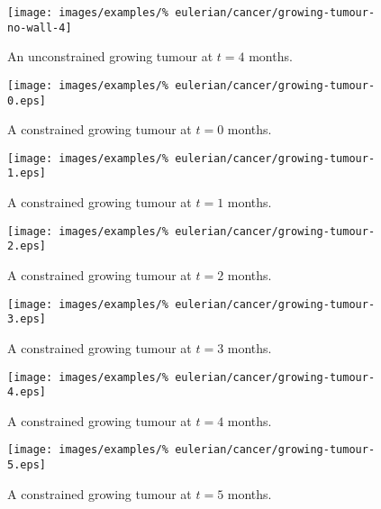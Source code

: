 \begin{figure}[!hptb]
\centering
\texttt{[image: images/examples/\%
eulerian/cancer/growing-tumour-no-wall-4]}
\caption{An unconstrained growing tumour at $t=4$ months.}
\label{tumour-growth-no-wall-4}
\end{figure}

\begin{figure}[!hptb]
\centering
\texttt{[image: images/examples/\%
eulerian/cancer/growing-tumour-0.eps]}
\caption{A constrained growing tumour at $t=0$ months.}
\label{tumour-growth-constrained-0}
\end{figure}

\begin{figure}[!hptb]
\centering
\texttt{[image: images/examples/\%
eulerian/cancer/growing-tumour-1.eps]}
\caption{A constrained growing tumour at $t=1$ months.}
\label{tumour-growth-constrained-1}
\end{figure}

\begin{figure}[!hptb]
\centering
\texttt{[image: images/examples/\%
eulerian/cancer/growing-tumour-2.eps]}
\caption{A constrained growing tumour at $t=2$ months.}
\label{tumour-growth-constrained-2}
\end{figure}

\begin{figure}[!hptb]
\centering
\texttt{[image: images/examples/\%
eulerian/cancer/growing-tumour-3.eps]}
\caption{A constrained growing tumour at $t=3$ months.}
\label{tumour-growth-constrained-3}
\end{figure}

\begin{figure}[!hptb]
\centering
\texttt{[image: images/examples/\%
eulerian/cancer/growing-tumour-4.eps]}
\caption{A constrained growing tumour at $t=4$ months.}
\label{tumour-growth-constrained-4}
\end{figure}

\begin{figure}[!hptb]
\centering
\texttt{[image: images/examples/\%
eulerian/cancer/growing-tumour-5.eps]}
\caption{A constrained growing tumour at $t=5$ months.}
\label{tumour-growth-constrained-5}
\end{figure}




%

